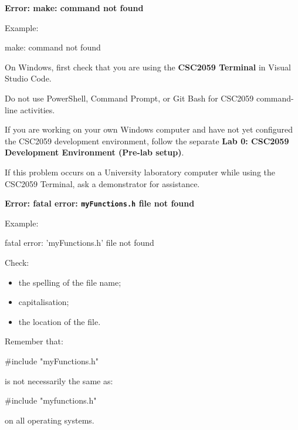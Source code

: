 \documentclass{csc2059practical}
\begin{document}
\begin{commonerror}
\textbf{Error: make: command not found}

Example:

\begin{terminal}
make: command not found
\end{terminal}

On Windows, first check that you are using the \textbf{CSC2059 Terminal} in Visual Studio Code.

Do not use PowerShell, Command Prompt, or Git Bash for CSC2059 command-line activities.

If you are working on your own Windows computer and have not yet configured the CSC2059 development environment, follow the separate \textbf{Lab 0: CSC2059 Development Environment (Pre-lab setup)}.

If this problem occurs on a University laboratory computer while using the CSC2059 Terminal, ask a demonstrator for assistance.
\end{commonerror}

\begin{commonerror}
\textbf{Error: fatal error: \texttt{myFunctions.h} file not found}

Example:

\begin{terminal}
fatal error: 'myFunctions.h' file not found
\end{terminal}

Check:

\begin{itemize}
  \item the spelling of the file name;
  \item capitalisation;
  \item the location of the file.
\end{itemize}

Remember that:

\begin{cppcode}
#include "myFunctions.h"
\end{cppcode}

is not necessarily the same as:

\begin{cppcode}
#include "myfunctions.h"
\end{cppcode}

on all operating systems.
\end{commonerror}
\end{document}
